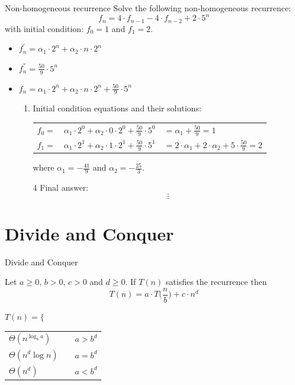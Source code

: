 \documentclass{beamer}
\begin{document}
\begin{frame}{Non-homogeneous recurrence}
    Solve the following non-homogeneous recurrence:
    \begin{equation}\tag{1}
        f_n = 4 \cdot f_{n-1} - 4 \cdot f_{n-2} + 2 \cdot 5^n
    \end{equation}
    with initial condition: $f_0 = 1$ and $f_1 = 2$.
    
    \begin{itemize}
        \item $ f_n^{'} = \alpha_1 \cdot 2^n + \alpha_2 \cdot n \cdot 2^n $
        \item $ f_n^{''} = \frac{50}{9} \cdot 5^n $
        \item $ f_n = \alpha_1 \cdot 2^n + \alpha_2 \cdot n \cdot 2^n + \frac{50}{9} \cdot 5^n $
        \begin{enumerate}[3]
            \item Initial condition equations and their solutions:
                \begin{tabular}{l l l}
                    \rule{0pt}{2ex}   $f_0 = $ & $\alpha_1 \cdot 2^0 + \alpha_2 \cdot 0 \cdot 2^0 + \frac{50}{9} \cdot 5^0$ & $= \alpha_1 + \frac{50}{9} = 1$ \\ 
                    \rule{0pt}{2ex}   $f_1 = $ & $\alpha_1 \cdot 2^1 + \alpha_2 \cdot 1 \cdot 2^1 + \frac{50}{9} \cdot 5^1$ & $= 2 \cdot \alpha_1 + 2 \cdot \alpha_2 + 5 \cdot \frac{50}{9} = 2 $ 
                \end{tabular}
                where $\alpha_1 = -\frac{41}{9} $ and $ \alpha_2 = -\frac{25}{3}$.
            \item[4] Final answer:
                $$ \vdots $$
        \end{enumerate}
    \end{itemize}
\end{frame}

\section{Divide and Conquer}

\begin{frame}{Divide and Conquer}
    \centering
    \begin{theorem}\label{theo:master}
        Let $a \geq 0$, $b > 0$, $c > 0$ and $d \geq 0$.  If $T(n)$ satisfies the recurrence then
        $$ T(n) = a \cdot T \Big(\frac{n}{b}\Big) + c \cdot n^d $$
    \end{theorem}
    
    
    $ T(n) = \Bigg\{$    \begin{tabular}{l r r}
        $\Theta (n^{\log_b a})$ & \hspace{1cm} & $a > b^d$ \\
        $\Theta (n^d \log n)$   & \hspace{1cm} & $a = b^d$ \\
        $\Theta (n^d)$          & \hspace{1cm} & $a < b^d$ \\
    \end{tabular}   
    
\end{frame}
\end{document}
